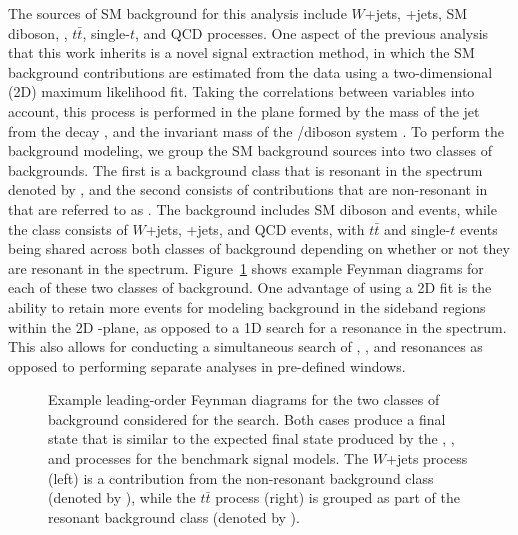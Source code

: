 The sources of SM background for this analysis include $W$+jets, \DY+jets, SM diboson, \bbbar, $t\bar{t}$, single-$t$, and QCD processes.
One aspect of the previous analysis that this work inherits is a novel signal extraction method, in which the SM background contributions are estimated from the data using a two-dimensional (2D) maximum likelihood fit.
Taking the correlations between variables into account, this process is performed in the plane formed by the mass of the jet from the \VorH decay \MJ, and the invariant mass of the \WV/\WH diboson system \MVV.
To perform the background modeling, we group the SM background sources into two classes of backgrounds.
The first is a background class that is resonant in the \MJ spectrum denoted by \WVt, and the second consists of contributions that are non-resonant in \MJ that are referred to as \Wjets.
The \WVt background includes SM diboson and \bbbar events, while the \Wjets class consists of $W$+jets, \DY+jets, and QCD events, with $t\bar{t}$ and single-$t$ events being shared across both classes of background depending on whether or not they are resonant in the \MJ spectrum.
Figure~\ref{fig:bkgFeynman} shows example Feynman diagrams for each of these two classes of background.
One advantage of using a 2D fit is the ability to retain more events for modeling background in the sideband regions within the 2D \MJ-\MVV plane, as opposed to a 1D search for a resonance in the \MVV spectrum.
This also allows for conducting a simultaneous search of \WW, \WZ, and \WH resonances as opposed to performing separate analyses in pre-defined \MJ windows.

\begin{figure}[htbp]
  \centering
  
  \caption{
    Example leading-order Feynman diagrams for the two classes of background considered for the search.
    Both cases produce a final state that is similar to the expected final state produced by the \ggF, \DY, and \VBF processes for the benchmark signal models.
    The $W$+jets process (left) is a contribution from the non-resonant background class (denoted by \Wjets), while the $t\bar{t}$ process (right) is grouped as part of the resonant background class (denoted by \WVt).
  }
  \label{fig:bkgFeynman}
\end{figure}

